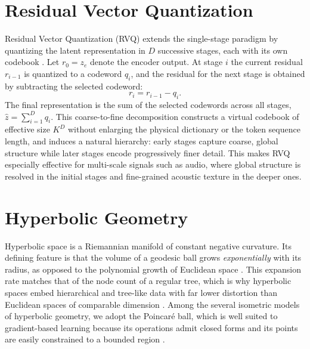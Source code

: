 \documentclass[12pt]{report}
\begin{document}
\section{Residual Vector Quantization}
\label{sec:bg_rvq}
Residual Vector Quantization (RVQ) extends the single-stage paradigm by quantizing the latent representation in $D$ successive stages, each with its own codebook \cite{soundstream}. Let $r_0 = z_e$ denote the encoder output. At stage $i$ the current residual $r_{i-1}$ is quantized to a codeword $q_i$, and the residual for the next stage is obtained by subtracting the selected codeword:
\begin{equation}
    \label{eq:bg_rvq_residual}
    r_i = r_{i-1} - q_i.
\end{equation}
The final representation is the sum of the selected codewords across all stages, $\hat{z} = \sum_{i=1}^{D} q_i$. This coarse-to-fine decomposition constructs a virtual codebook of effective size $K^D$ without enlarging the physical dictionary or the token sequence length, and induces a natural hierarchy: early stages capture coarse, global structure while later stages encode progressively finer detail. This makes RVQ especially effective for multi-scale signals such as audio, where global structure is resolved in the initial stages and fine-grained acoustic texture in the deeper ones. 

\section{Hyperbolic Geometry}
\label{sec:bg_hyperbolic}
Hyperbolic space is a Riemannian manifold of constant negative curvature. Its defining feature is that the volume of a geodesic ball grows \emph{exponentially} with its radius, as opposed to the polynomial growth of Euclidean space \cite{cannon1997hyperbolic}. This expansion rate matches that of the node count of a regular tree, which is why hyperbolic spaces embed hierarchical and tree-like data with far lower distortion than Euclidean spaces of comparable dimension \cite{sala2018representation, nickel2017poincare}. Among the several isometric models of hyperbolic geometry, we adopt the Poincar\'e ball, which is well suited to gradient-based learning because its operations admit closed forms and its points are easily constrained to a bounded region \cite{ganea2018hyperbolic}.
\end{document}
